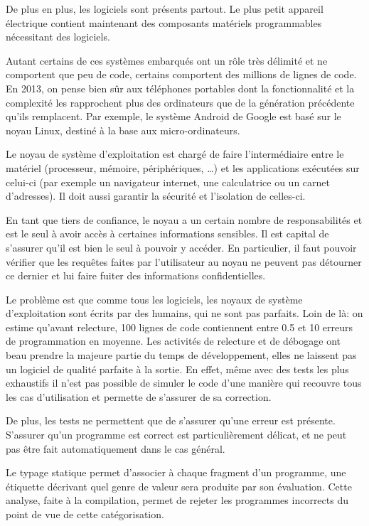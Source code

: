 De plus en plus, les logiciels sont présents partout. Le plus petit appareil
électrique contient maintenant des composants matériels programmables
nécessitant des logiciels.

Autant certains de ces systèmes embarqués ont un rôle très délimité et ne
comportent que peu de code, certains comportent des millions de lignes de code.
En 2013, on pense bien sûr aux téléphones portables dont la fonctionnalité et la
complexité les rapprochent plus des ordinateurs que de la génération précédente
qu'ils remplacent. Par exemple, le système Android de Google est basé sur le noyau
Linux, destiné à la base aux micro-ordinateurs.

Le noyau de système d'exploitation est chargé de faire l'intermédiaire entre le
matériel (processeur, mémoire, périphériques, …) et les applications exécutées
sur celui-ci (par exemple un navigateur internet, une calculatrice ou un carnet
d'adresses). Il doit aussi garantir la sécurité et l'isolation de celles-ci.

En tant que tiers de confiance, le noyau a un certain nombre de responsabilités
et est le seul à avoir accès à certaines informations sensibles. Il est capital
de s'assurer qu'il est bien le seul à pouvoir y accéder. En particulier, il faut
pouvoir vérifier que les requêtes faites par l'utilisateur au noyau ne peuvent
pas détourner ce dernier et lui faire fuiter des informations confidentielles.

Le problème est que comme tous les logiciels, les noyaux de système
d'exploitation sont écrits par des humains, qui ne sont pas parfaits. Loin de
là: on estime qu'avant relecture, 100 lignes de code contiennent entre 0.5 et 10
erreurs de programmation en moyenne.
Les activités de relecture et de
débogage ont beau prendre la majeure partie du temps de développement, elles ne
laissent pas un logiciel de qualité parfaite à la sortie. En effet,
même avec des tests les plus exhaustifs il n'est pas possible de simuler le code
d'une manière qui recouvre tous les cas d'utilisation et permette de s'assurer
de sa correction.

De plus, les tests ne permettent que de s'assurer qu'une erreur est présente.
S'assurer qu'un programme est correct est particulièrement délicat, et ne peut
pas être fait automatiquement dans le cas général.

Le typage statique permet d'associer à chaque fragment d'un programme, une
étiquette décrivant quel genre de valeur sera produite par son évaluation. Cette
analyse, faite à la compilation, permet de rejeter les programmes incorrects du
point de vue de cette catégorisation.

